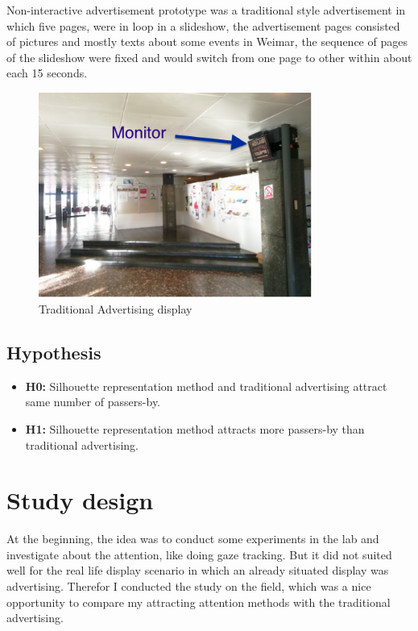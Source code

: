 Non-interactive advertisement prototype was a traditional style advertisement in which five pages, were in loop in a slideshow, the advertisement pages consisted of pictures and mostly texts about some events in Weimar, the sequence of pages of the slideshow were fixed and would switch from one page to other within about each 15 seconds.

\begin{figure}[H]
\centering
    \includegraphics[width=0.8\textwidth,height=0.35\textheight]{Figures/3/Kasseturm_monitor}
    \caption{Traditional Advertising display}
    \label{fig:kassAdvertising}
\end{figure}


\subsection{Hypothesis}

\begin{itemize}
\item \textbf{H0:} Silhouette representation method and traditional advertising attract same number of passers-by.
\item \textbf{H1:} Silhouette representation method attracts more passers-by than traditional advertising.

\end{itemize}



\section{Study design}
At the beginning, the idea was to conduct some experiments in the lab and investigate about the attention, like doing gaze tracking. But it did not suited well for the real life display scenario in which an already situated display was advertising. Therefor I conducted the study on the field, which was a nice opportunity to compare my attracting attention methods with the traditional advertising. 

